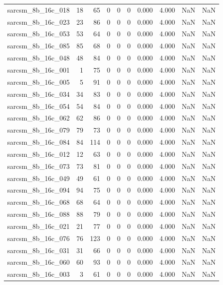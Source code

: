 \documentclass{article}
\begin{document}
\begin{longtable}{lrrrrrrrrr}
sarcsm\_8b\_16c\_018 & 18 & 65 & 0 & 0 & 0 & 0.000 & 4.000 & NaN & NaN \\
sarcsm\_8b\_16c\_023 & 23 & 86 & 0 & 0 & 0 & 0.000 & 4.000 & NaN & NaN \\
sarcsm\_8b\_16c\_053 & 53 & 64 & 0 & 0 & 0 & 0.000 & 4.000 & NaN & NaN \\
sarcsm\_8b\_16c\_085 & 85 & 68 & 0 & 0 & 0 & 0.000 & 4.000 & NaN & NaN \\
sarcsm\_8b\_16c\_048 & 48 & 84 & 0 & 0 & 0 & 0.000 & 4.000 & NaN & NaN \\
sarcsm\_8b\_16c\_001 & 1 & 75 & 0 & 0 & 0 & 0.000 & 4.000 & NaN & NaN \\
sarcsm\_8b\_16c\_005 & 5 & 91 & 0 & 0 & 0 & 0.000 & 4.000 & NaN & NaN \\
sarcsm\_8b\_16c\_034 & 34 & 83 & 0 & 0 & 0 & 0.000 & 4.000 & NaN & NaN \\
sarcsm\_8b\_16c\_054 & 54 & 84 & 0 & 0 & 0 & 0.000 & 4.000 & NaN & NaN \\
sarcsm\_8b\_16c\_062 & 62 & 86 & 0 & 0 & 0 & 0.000 & 4.000 & NaN & NaN \\
sarcsm\_8b\_16c\_079 & 79 & 73 & 0 & 0 & 0 & 0.000 & 4.000 & NaN & NaN \\
sarcsm\_8b\_16c\_084 & 84 & 114 & 0 & 0 & 0 & 0.000 & 4.000 & NaN & NaN \\
sarcsm\_8b\_16c\_012 & 12 & 63 & 0 & 0 & 0 & 0.000 & 4.000 & NaN & NaN \\
sarcsm\_8b\_16c\_073 & 73 & 81 & 0 & 0 & 0 & 0.000 & 4.000 & NaN & NaN \\
sarcsm\_8b\_16c\_049 & 49 & 61 & 0 & 0 & 0 & 0.000 & 4.000 & NaN & NaN \\
sarcsm\_8b\_16c\_094 & 94 & 75 & 0 & 0 & 0 & 0.000 & 4.000 & NaN & NaN \\
sarcsm\_8b\_16c\_068 & 68 & 64 & 0 & 0 & 0 & 0.000 & 4.000 & NaN & NaN \\
sarcsm\_8b\_16c\_088 & 88 & 79 & 0 & 0 & 0 & 0.000 & 4.000 & NaN & NaN \\
sarcsm\_8b\_16c\_021 & 21 & 77 & 0 & 0 & 0 & 0.000 & 4.000 & NaN & NaN \\
sarcsm\_8b\_16c\_076 & 76 & 123 & 0 & 0 & 0 & 0.000 & 4.000 & NaN & NaN \\
sarcsm\_8b\_16c\_031 & 31 & 66 & 0 & 0 & 0 & 0.000 & 4.000 & NaN & NaN \\
sarcsm\_8b\_16c\_060 & 60 & 93 & 0 & 0 & 0 & 0.000 & 4.000 & NaN & NaN \\
sarcsm\_8b\_16c\_003 & 3 & 61 & 0 & 0 & 0 & 0.000 & 4.000 & NaN & NaN \\

\end{longtable}
\end{document}
